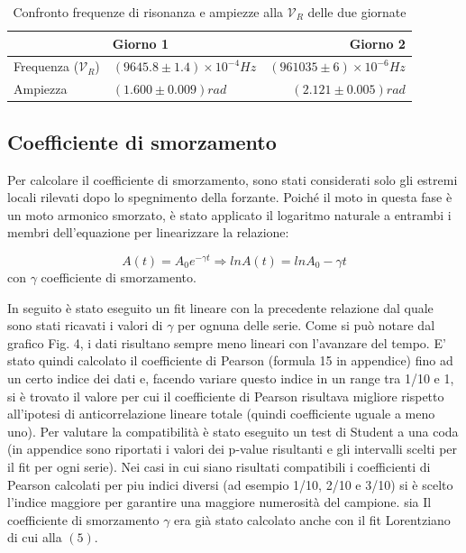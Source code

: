 \documentclass{article}
\begin{document}
\begin{table}[h!]
    \centering
    \begin{tabular}{llr}
      \toprule \hline
      & Giorno 1 & Giorno 2 \\
      \midrule
      Frequenza ($\mathcal{V}_R$) & $(9645.8 \pm 1.4) \times 10^{-4}Hz$ & $(961035 \pm 6) \times 10^{-6}Hz$ \\
      \midrule
      Ampiezza & $(1.600 \pm 0.009) rad$ & $(2.121 \pm 0.005) rad$ \\
      \bottomrule
    \end{tabular}
    \caption{Confronto frequenze di risonanza e ampiezze alla $\mathcal{V}_R$ delle due giornate}
    \label{confronto_risonanza}
\end{table}

\subsection{Coefficiente di smorzamento}
Per calcolare il coefficiente di smorzamento, sono stati considerati solo gli estremi locali rilevati dopo lo spegnimento della forzante. Poiché il moto in questa fase è un moto armonico smorzato, è stato applicato il logaritmo naturale a entrambi i membri dell’equazione per linearizzare la relazione:

\begin{equation}
    A(t)= A_0 e^{-\gamma t} \Rightarrow lnA(t)=lnA_0-\gamma t
\end{equation}
con $\gamma$ coefficiente di smorzamento.


In seguito è stato eseguito un fit lineare con la precedente relazione dal quale sono stati ricavati i valori di $\gamma$ per ognuna delle serie. Come si può notare dal grafico Fig. 4, i dati risultano sempre meno lineari con l'avanzare del tempo. E' stato quindi calcolato il coefficiente di Pearson (formula 15 in appendice) fino ad un certo indice dei dati e, facendo variare questo indice in un range tra 1/10 e 1, si è trovato il valore per cui il coefficiente di Pearson risultava migliore rispetto all'ipotesi di anticorrelazione lineare totale (quindi coefficiente uguale a meno uno). Per valutare la compatibilità è stato eseguito un test di Student a una coda (in appendice sono riportati i valori dei p-value risultanti e gli intervalli scelti per il fit per ogni serie). Nei casi in cui siano risultati compatibili i coefficienti di Pearson calcolati per piu indici diversi (ad esempio 1/10, 2/10 e 3/10) si è scelto l'indice maggiore per garantire una maggiore numerosità del campione. sia  Il coefficiente di smorzamento $\gamma$ era già stato calcolato anche con il fit Lorentziano di cui alla $(5)$.
\end{document}
